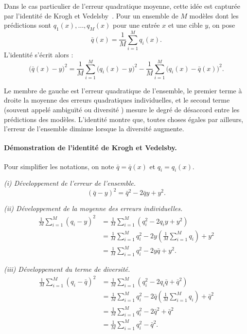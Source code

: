 Dans le cas particulier de l'erreur quadratique moyenne, cette id{\'e}e est captur{\'e}e par
l'identit{\'e} de Krogh et Vedelsby~\cite{krogh_vedelsby_ambiguity}. Pour un ensemble de $M$ mod{\`e}les
dont les pr{\'e}dictions sont $q_1(x),\dots,q_M(x)$ pour une entr{\'e}e $x$ et une cible $y$, on pose
\[
  \bar{q}(x) = \frac{1}{M} \sum_{i=1}^M q_i(x).
\]
L'identit{\'e} s'\'ecrit alors :
\begin{equation}
  \bigl(\bar{q}(x) - y\bigr)^2
  = \frac{1}{M} \sum_{i=1}^M \bigl(q_i(x) - y\bigr)^2
    - \frac{1}{M} \sum_{i=1}^M \bigl(q_i(x) - \bar{q}(x)\bigr)^2.
\end{equation}

Le membre de gauche est l'erreur quadratique de l'ensemble, le premier terme {\`a} droite la moyenne
des erreurs quadratiques individuelles, et le second terme (souvent appel{\'e} \og ambigu{\"i}t{\'e} \fg{} ou
\og diversit{\'e} \fg{}) mesure le degr{\'e} de d{\'e}saccord entre les pr{\'e}dictions des mod{\`e}les.
L'identit{\'e} montre que, toutes choses {\'e}gales par ailleurs, l'erreur de l'ensemble diminue lorsque
la diversit{\'e} augmente.

\paragraph{D{\'e}monstration de l'identit{\'e} de Krogh et Vedelsby.}
Pour simplifier les notations, on note $\bar{q} = \bar{q}(x)$ et $q_i = q_i(x)$.

\emph{(i) D{\'e}veloppement de l'erreur de l'ensemble.}
\[
  (\bar{q} - y)^2 = \bar{q}^2 - 2 \bar{q} y + y^2.
\]

\emph{(ii) D{\'e}veloppement de la moyenne des erreurs individuelles.}
\begin{align}
  \frac{1}{M} \sum_{i=1}^M (q_i - y)^2
  &= \frac{1}{M} \sum_{i=1}^M (q_i^2 - 2 q_i y + y^2) \\
  &= \frac{1}{M} \sum_{i=1}^M q_i^2 - 2 y \left( \frac{1}{M} \sum_{i=1}^M q_i \right) + y^2 \\
  &= \frac{1}{M} \sum_{i=1}^M q_i^2 - 2 y \bar{q} + y^2.
\end{align}

\emph{(iii) D{\'e}veloppement du terme de diversit{\'e}.}
\begin{align}
  \frac{1}{M} \sum_{i=1}^M (q_i - \bar{q})^2
  &= \frac{1}{M} \sum_{i=1}^M (q_i^2 - 2 q_i \bar{q} + \bar{q}^2) \\
  &= \frac{1}{M} \sum_{i=1}^M q_i^2 - 2 \bar{q} \left( \frac{1}{M} \sum_{i=1}^M q_i \right) + \bar{q}^2 \\
  &= \frac{1}{M} \sum_{i=1}^M q_i^2 - 2 \bar{q}^2 + \bar{q}^2 \\
  &= \frac{1}{M} \sum_{i=1}^M q_i^2 - \bar{q}^2.
\end{align}

